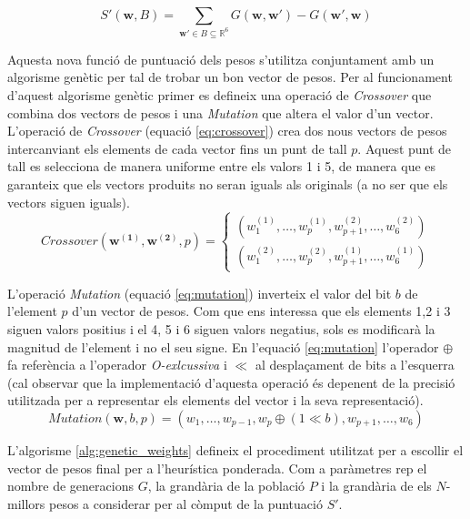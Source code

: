 \documentclass[12pt,a4paper]{article}
\begin{document}
\begin{equation}\label{eq:weight_score_restricted}
S'(\mathbf{w}, B) = \sum_{\mathbf{w'} \in B \subseteq \mathbb{R}^6} G(\mathbf{w}, \mathbf{w'}) - G(\mathbf{w'}, \mathbf{w})
\end{equation}

Aquesta nova funció de puntuació dels pesos s'utilitza conjuntament amb un algorisme genètic per tal de trobar un bon vector de pesos. Per al funcionament d'aquest algorisme genètic primer es defineix una operació de \emph{Crossover} que combina dos vectors de pesos i una \emph{Mutation} que altera el valor d'un vector. L'operació de \emph{Crossover} (equació \ref{eq:crossover}) crea dos nous vectors de pesos intercanviant els elements de cada vector fins un punt de tall $p$. Aquest punt de tall es selecciona de manera uniforme entre els valors 1 i 5, de manera que es garanteix que els vectors produits no seran iguals als originals (a no ser que els vectors siguen iguals).\\

\begin{equation}\label{eq:crossover}
Crossover(\mathbf{w^{(1)}}, \mathbf{w^{(2)}}, p) =\begin{cases} 
(w^{(1)}_1,\ldots,w^{(1)}_p,w^{(2)}_{p+1},\ldots,w^{(2)}_{6})\\
(w^{(2)}_1,\ldots,w^{(2)}_p,w^{(1)}_{p+1},\ldots,w^{(1)}_{6})
\end{cases}
\end{equation}

L'operació \emph{Mutation} (equació \ref{eq:mutation}) inverteix el valor del bit $b$ de l'element $p$ d'un vector de pesos. Com que ens interessa que els elements 1,2 i 3 siguen valors positius i el 4, 5 i 6 siguen valors negatius, sols es modificarà la magnitud de l'element i no el seu signe. En l'equació \ref{eq:mutation} l'operador $\oplus$ fa referència a l'operador \emph{O-exlcussiva} i $\ll$ al desplaçament de bits a l'esquerra (cal observar que la implementació d'aquesta operació és depenent de la precisió utilitzada per a representar els elements del vector i la seva representació).\\

\begin{equation}\label{eq:mutation}
Mutation(\mathbf{w}, b, p) = (w_1, \ldots, w_{p-1}, w_p \oplus (1 \ll b), w_{p+1}, \ldots, w_6)
\end{equation}

L'algorisme \ref{alg:genetic_weights} defineix el procediment utilitzat per a escollir el vector de pesos final per a l'heurística ponderada. Com a paràmetres rep el nombre de generacions $G$, la grandària de la població $P$ i la grandària de els $N$-millors pesos a considerar per al còmput de la puntuació $S'$.\\
\end{document}
